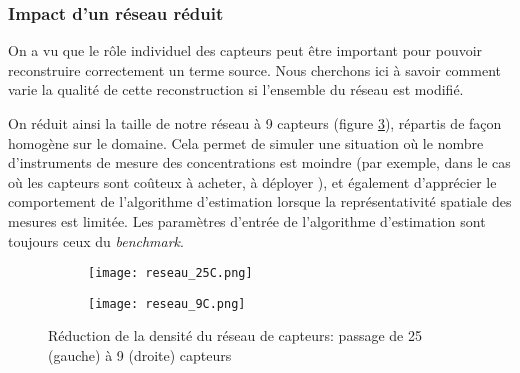 \subsubsection{Impact d'un réseau réduit}

On a vu que le rôle individuel des capteurs peut être important pour pouvoir reconstruire correctement un terme source. Nous cherchons ici à savoir comment varie la qualité de cette reconstruction si l'ensemble du réseau est modifié.

On réduit ainsi la taille de notre réseau à 9 capteurs (figure \ref{fig_reseaux_25_9}), répartis de façon homogène sur le domaine. Cela permet de simuler une situation où le nombre d'instruments de mesure des concentrations est moindre (par exemple, dans le cas où les capteurs sont coûteux à acheter, à déployer ), et également d'apprécier le comportement de l'algorithme d'estimation lorsque la représentativité spatiale des mesures est limitée. Les paramètres d'entrée de l'algorithme d'estimation sont toujours ceux du \textit{benchmark}.\\

\begin{figure}[h!]
	\centering
	\begin{subfigure}[t]{0.5\textwidth}
		\centering
		\texttt{[image: reseau\_25C.png]}
		\caption{}
		\label{reseau_25C}
	\end{subfigure}%
	\begin{subfigure}[t]{0.5\textwidth}
		\centering
		\texttt{[image: reseau\_9C.png]}
		\caption{}
		\label{reseau_9C}
	\end{subfigure}
	\caption{Réduction de la densité du réseau de capteurs: passage de 25 (gauche) à 9 (droite) capteurs}
	\label{fig_reseaux_25_9}
\end{figure}


